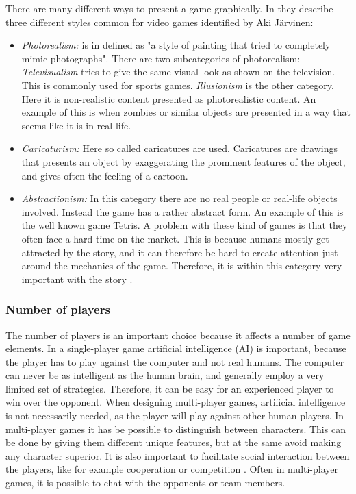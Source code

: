 There are many different ways to present a game graphically. In \cite{understandingvg} they describe three different styles common for video games identified by Aki Järvinen: 

\begin{itemize}
\item \emph{Photorealism:} is in \cite{understandingvg} defined as "a style of painting that tried to completely mimic photographs". There are two subcategories of photorealism: \emph{Televisualism} tries to give the same visual look as shown on the television. This is commonly used for sports games. \emph{Illusionism} is the other category. Here it is non-realistic content presented as photorealistic content. An example of this is when zombies or similar objects are presented in a way that seems like it is in real life.  
\item \emph{Caricaturism:} Here so called caricatures are used. Caricatures are drawings that presents an object by exaggerating the prominent features of the object, and gives often the feeling of a cartoon. 
\item \emph{Abstractionism:} In this category there are no real people or real-life objects involved. Instead  the game has a rather abstract form. An example of this is the well known game Tetris. A problem with these kind of games is that they often face a hard time on the market. This is because humans mostly get attracted by the story, and it can therefore be hard to create attention just around the mechanics of the game. Therefore, it is within this category very important with the story \cite{understandingvg}. 
\end{itemize}

\subsubsection{Number of players}
\label{subsec:numbers}
The number of players is an important choice because it affects a number of game elements. In a single-player game artificial intelligence (AI) is important, because the player has to play against the computer and not real humans. The computer can never be as intelligent as the human brain, and generally employ a very limited set of strategies. Therefore, it can be easy for an experienced player to win over the opponent. When designing multi-player games, artificial intelligence is not necessarily needed, as the player will play against other human players. In multi-player games it has be possible to distinguish between characters. This can be done by giving them different unique features, but at the same avoid making any character superior. It is also important to facilitate social interaction between the players, like for example cooperation or competition \cite{understandingvg}. Often in multi-player games, it is possible to chat with the opponents or team members. 

